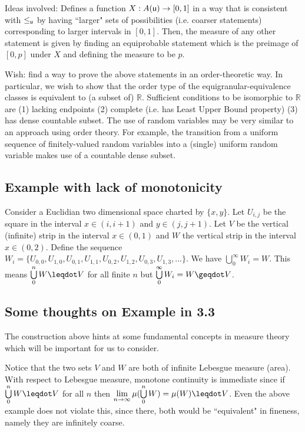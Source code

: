 \documentclass[10pt, onecolumn, nofootinbib]{revtex4-1}
\begin{document}
Ideas involved: Defines a function $X:A(\stmt[u])\to [0,1]$ in a way that is consistent with $\lequ$ by having ``larger" sets of possibilities (i.e. coarser statements) corresponding to larger intervals in $[0,1]$. Then, the measure of any other statement is given by finding an equiprobable statement which is the preimage of $[0,p]$ under $X$ and defining the measure to be $p$.  

Wish: find a way to prove the above statements in an order-theoretic way. In particular, we wish to show that the order type of the equigranular-equivalence classes is equivalent to (a subset of) $\mathbb{R}$. Sufficient conditions to be isomorphic to $\mathbb{R}$ are (1) lacking endpoints (2) complete (i.e. has Least Upper Bound property) (3) has dense countable subset. The use of random variables may be very similar to an approach using order theory. For example, the transition from a uniform sequence of finitely-valued random variables into a (single) uniform random variable makes use of a countable dense subset. 








\subsection{Example with lack of monotonicity}

Consider a Euclidian two dimensional space charted by $\{x,y\}$. Let $U_{i,j}$ be the square in the interval $x \in (i, i+1)$ and $y \in (j, j+1)$. Let $V$ be the vertical (infinite) strip in the interval $x \in (0, 1)$ and $W$ the vertical strip in the interval $x \in (0, 2)$. Define the sequence $W_i = \{ U_{0,0}, U_{1,0}, U_{0,1}, U_{1,1}, U_{0,2}, U_{1,2}, U_{0,3}, U_{1,3}, ... \}$. We have $\bigcup\limits_0^\infty W_i = W$. This means $\bigcup\limits_0^n W\finer V$ for all finite $n$ but $\bigcup\limits_0^\infty W_i = W \coarser V$. 

\subsection{Some thoughts on Example in 3.3}

The construction above hints at some fundamental concepts in measure theory which will be important for us to consider. 

Notice that the two sets $V$ and $W$ are both of infinite Lebesgue measure (area). With respect to Lebesgue measure, monotone continuity is immediate since if $\bigcup\limits_0^n W\finer V$ for all $n$ then $\lim\limits_{n\to\infty}\mu(\bigcup\limits_0^n W) = \mu(W)\finer V$. Even the above example does not violate this, since there, both would be ``equivalent" in fineness, namely they are infinitely coarse.
\end{document}
